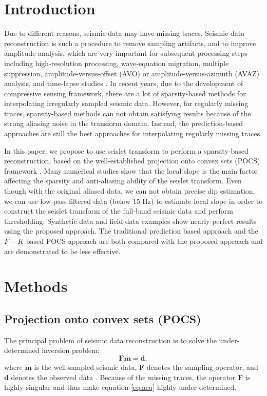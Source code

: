 

\section{Introduction}
Due to different reasons, seismic data may have missing traces. Seismic data reconstruction is such a procedure to remove sampling artifacts, and to improve amplitude analysis, which are very important for subsequent processing steps including high-resolution processing, wave-equation migration, multiple suppression, amplitude-versus-offset (AVO) or amplitude-versus-azimuth (AVAZ) analysis, and time-lapse studies \cite{daniel2002,liubin2004,abma2005,juefu2010,mostafa2010,yangkang2015eage2}. In recent years, due to the development of compressive sensing framework, there are a lot of sparsity-based methods for interpolating irregularly sampled seismic data. However, for regularly missing traces, sparsity-based methods \cite{abma2006,chengbo2012,yangkang2014halfthr} can not obtain satisfying results because of the strong aliasing noise in the transform domain. Instead, the prediction-based approaches \cite{spitz1991,mostafa2007} are still the best approaches for interpolating regularly missing traces. 

In this paper, we propose to use seislet transform to perform a sparsity-based reconstruction, based on the well-established projection onto convex sets (POCS) framework \cite{abma2006}. Many numerical studies show that the local slope is the main factor affecting the sparsity and anti-aliasing ability of the seislet transform. Even though with the original aliased data, we can not obtain precise dip estimation, we can use low-pass filtered data (below 15 Hz) to estimate local slope in order to construct the seislet transform of the full-band seismic data and perform thresholding. Synthetic data and field data examples show nearly perfect results using the proposed approach. The traditional prediction based approach and the $F-K$ based POCS approach are both compared with the proposed approach and are demonstrated to be less effective.

\section{Methods}
\subsection{Projection onto convex sets (POCS)}
The principal problem of seismic data reconstruction is to solve the under-determined inversion problem:
\begin{equation}
\label{eq:acq}
\mathbf{Fm}=\mathbf{d},
\end{equation}
where $\mathbf{m}$ is the well-sampled seismic data, $\mathbf{F}$ denotes the sampling operator, and $\mathbf{d}$ denotes the observed data \cite{yangkang2014halfthr}. Because of the missing traces, the operator $\mathbf{F}$ is highly singular and thus make equation \ref{eq:acq} highly under-determined.

